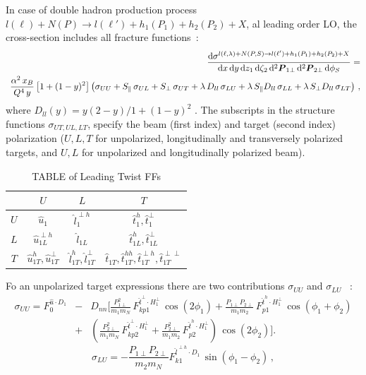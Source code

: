 \documentclass[11pt,a4paper]{article}
\newcommand{\be}{\begin{equation}}
\newcommand{\ee}{\end{equation}}
\newcommand{\bq}{\begin{eqnarray}}
\newcommand{\eq}{\end{eqnarray}}
\newcommand{\D}{\mathrm{d}}
\def\Vec#1{\mathpalette{\VVec}{#1}}
\def\VVec#1#2{\mbox{\boldmath$#1#2$\unboldmath}}
\begin{document}
In case of double hadron production process $l(\ell) + N(P) \to l(\ell') + h_1(P_1) + h_2(P_2) + X$,
al leading order LO, the cross-section includes all fracture functions~\cite{Anselmino:2011ss,Anselmino:2011bb}:
%
\bq \label{cs-2h}
&& \hspace{1.cm}
\frac{\D\sigma^{l(\ell,\lambda)+N(P,S) \to l(\ell')+h_1(P_1)+h_2(P_2)+X}}
{\D x \, \D y \, \D z_1 \, \D\zeta_2 \, \D^2 {\Vec P_{1\perp}} \,
\D^2 {\Vec P_{2\perp}} \, \D \phi_S} =
\nonumber \\
&& \hspace{-0.2cm}
\frac{\alpha^2\,x_B}{Q^4 \, y}\left[ 1+(1-y)^2 \right]
\left(\sigma_{UU} + S_\parallel \,\sigma_{UL} + S_\perp \,\sigma_{UT}+
\lambda \, D_{ll} \, \sigma_{LU} + \lambda \,S_\parallel D_{ll}\,\sigma_{LL}
+\lambda \, S_\perp D_{ll}\,\sigma_{LT} \right)\, ,
\nonumber
\eq
where $D_{ll}(y) = {y(2-y)}/{1+(1-y)^2}$ .
The subscripts in the structure functions $\sigma_{UT,UL,LT}$, specify the beam 
(first index) and  target (second index) polarization ($U,L,T$ for unpolarized, 
longitudinally and transversely polarized targets, and $U,L$ for unpolarized and 
longitudinally polarized beam).


\begin{table}[h]
\begin{center}
\caption{TABLE of Leading Twist FFs}
\vspace{0.2 truecm}
\begin{tabular}{|c|c|c|c|}
\hline
&$U$&$L$&$T$\\
\hline
$U$&$\hat{u}_1$&$\hat{l}^{\perp h}_1$&$\hat{t}^{h}_1,\hat{t}^{\perp }_1$ \\
\hline
$L$&$\hat{u}^{\perp h}_{1L}$&$\hat{l}_{1L}$&$\hat{t}^{h}_{1L},\hat{t}^{\perp }_{1L}$\\
\hline
$T$&$\hat{u}^{h}_{1T},\hat{u}^{\perp }_{1T}$&$\hat{l}^{h}_{1T},\hat{l}^{\perp }_{1T}$&$\hat{t}_{1T},\hat{t}^{hh}_{1T},\hat{t}^{\perp h}_{1T},\hat{t}^{\perp \perp }_{1T}$\\
\hline
\end{tabular}
\end{center}
\end{table}

Fo an unpolarized target expressions there are two contributions $\sigma_{UU}$ and $\sigma_{LU}$ ~\cite{Anselmino:2011ss}:
%
\bq\label{s_uu}
\sigma_{UU}  =  F_0^{{\hat u} \cdot D_1}
& - & D_{{nn}} \Bigg[\frac{P_{{1\perp}}^2 }{m_1 m_N}\, F_{{kp1}}^{{\hat t}^\perp \cdot H_1^\perp}\,{\cos}(2 \phi _1)
+ \frac{P_{{1\perp}} P_{{2\perp}} }{m_1 m_2}\, F_{{p1}}^{{\hat t}^h
\cdot H_1^\perp}\, {\cos}(\phi _1+\phi _2)\nonumber \\
& + & \left(\frac{P_{{2\perp}}^2 }{m_1 m_N}\, F_{{kp2}}^{{\hat t}^\perp
\cdot H_1^\perp} + \frac{P_{{2\perp}}^2 }{m_1 m_2}\, F_{{p2}}^{{\hat t^h}
\cdot H_1^\perp}\right)\, {\cos}(2 \phi _2)\Bigg].
\eq
\be
\sigma_{LU} = -\frac{ P_{{1\perp}} P_{{2\perp}}}{m_2 m_N}  F_{{k1}}^{{\hat l}^{\perp h}\cdot D_1} \, \sin(\phi _1-\phi _2)
\, ,
\ee
\end{document}

